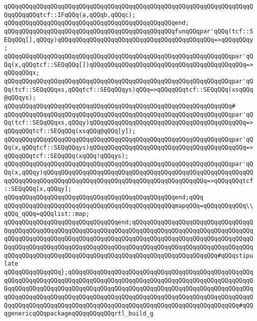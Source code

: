 \verb|qQQqqQQqqQQqqQQqqQQqqQQqqQQqqQQqqQQqqQQqqQQqqQQqqQQqqQQqqQQqqQQqqQQqqQQqqQQqqQQqtcf::IFqQQq(a,qQQqb,qQQqc);|\newline
\verb|qQQqqQQqqQQqqQQqqQQqqQQqqQQqqQQqqQQqqQQqqQQqqQQqend;|\newline
\newline
\verb|qQQqqQQqqQQqqQQqqQQqqQQqqQQqqQQqqQQqqQQqqQQqqQQqfunqQQqpar'qQQq(tcf::SEQqQQq[],qQQqy)qQQqqQQqqQQqqQQqqQQqqQQqqQQqqQQqqQQqqQQqqQQq=>qQQqqQQqy;|\newline
\verb|qQQqqQQqqQQqqQQqqQQqqQQqqQQqqQQqqQQqqQQqqQQqqQQqqQQqqQQqqQQqqQQqpar'qQQq(x,qQQqtcf::SEQqQQq[])qQQqqQQqqQQqqQQqqQQqqQQqqQQqqQQqqQQqqQQqqQQq=>qQQqqQQqx;|\newline
\verb|qQQqqQQqqQQqqQQqqQQqqQQqqQQqqQQqqQQqqQQqqQQqqQQqqQQqqQQqqQQqqQQqpar'qQQq(tcf::SEQqQQqxs,qQQqtcf::SEQqQQqys)qQQq=>qQQqqQQqtcf::SEQqQQq(xsqQQq@qQQqys);|\newline
\verb|qQQqqQQqqQQqqQQqqQQqqQQqqQQqqQQqqQQqqQQqqQQqqQQqqQQqqQQqqQQqqQQq#|\newline
\verb|qQQqqQQqqQQqqQQqqQQqqQQqqQQqqQQqqQQqqQQqqQQqqQQqqQQqqQQqqQQqqQQqpar'qQQq(tcf::SEQqQQqxs,qQQqy)qQQqqQQqqQQqqQQqqQQqqQQqqQQqqQQqqQQqqQQqqQQq=>qQQqqQQqtcf::SEQqQQq(xsqQQq@qQQq[y]);|\newline
\verb|qQQqqQQqqQQqqQQqqQQqqQQqqQQqqQQqqQQqqQQqqQQqqQQqqQQqqQQqqQQqqQQqpar'qQQq(x,qQQqtcf::SEQqQQqys)qQQqqQQqqQQqqQQqqQQqqQQqqQQqqQQqqQQqqQQqqQQq=>qQQqqQQqtcf::SEQqQQq(xqQQq!qQQqys);|\newline
\verb|qQQqqQQqqQQqqQQqqQQqqQQqqQQqqQQqqQQqqQQqqQQqqQQqqQQqqQQqqQQqqQQqpar'qQQq(x,qQQqy)qQQqqQQqqQQqqQQqqQQqqQQqqQQqqQQqqQQqqQQqqQQqqQQqqQQqqQQqqQQqqQQqqQQqqQQqqQQqqQQqqQQqqQQqqQQqqQQqqQQqqQQqqQQqqQQqqQQq=>qQQqqQQqtcf::SEQqQQq[x,qQQqy];|\newline
\verb|qQQqqQQqqQQqqQQqqQQqqQQqqQQqqQQqqQQqqQQqqQQqqQQqend;qQQq|\newline
\newline
\verb|qQQqqQQqqQQqqQQqqQQqqQQqqQQqqQQqqQQqqQQqqQQqqQQqmapqQQq=qQQqqQQqqQQq\\qQQq_qQQq=qQQqlist::map;|\newline
\verb|qQQqqQQqqQQqqQQqqQQqqQQqqQQqqQQqend;qQQqqQQqqQQqqQQqqQQqqQQqqQQqqQQqqQQqqQQqqQQqqQQqqQQqqQQqqQQqqQQqqQQqqQQqqQQqqQQqqQQqqQQqqQQqqQQqqQQqqQQqqQQqqQQqqQQqqQQqqQQqqQQqqQQqqQQqqQQqqQQqqQQqqQQqqQQqqQQqqQQqqQQqqQQqqQQqqQQqqQQqqQQqqQQqqQQqqQQqqQQqqQQqqQQqqQQqqQQqqQQqqQQqqQQqqQQqqQQqqQQqqQQqqQQqqQQqqQQqqQQqqQQqqQQqqQQqqQQqqQQqqQQqqQQqqQQqqQQqqQQq#qQQqstipulate|\newline
\verb|qQQqqQQqqQQqqQQq};qQQqqQQqqQQqqQQqqQQqqQQqqQQqqQQqqQQqqQQqqQQqqQQqqQQqqQQqqQQqqQQqqQQqqQQqqQQqqQQqqQQqqQQqqQQqqQQqqQQqqQQqqQQqqQQqqQQqqQQqqQQqqQQqqQQqqQQqqQQqqQQqqQQqqQQqqQQqqQQqqQQqqQQqqQQqqQQqqQQqqQQqqQQqqQQqqQQqqQQqqQQqqQQqqQQqqQQqqQQqqQQqqQQqqQQqqQQqqQQqqQQqqQQqqQQqqQQqqQQqqQQqqQQqqQQqqQQqqQQqqQQqqQQqqQQqqQQqqQQqqQQqqQQqqQQqqQQqqQQqqQQqqQQq#qQQqgenericqQQqpackageqQQqqQQqqQQqrtl_build_g|\newline
